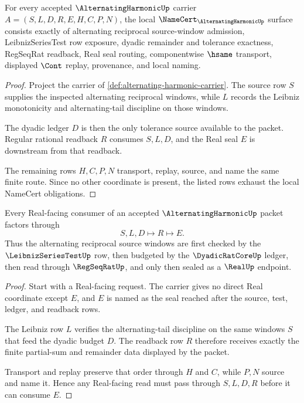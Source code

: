 \begin{theorem}
\label{thm:alternating-harmonic-namecert-obligations}
For every accepted $\AlternatingHarmonicUp$ carrier $A=(S,L,D,R,E,H,C,P,N)$, the local $\NameCert_{\AlternatingHarmonicUp}$ surface consists exactly of alternating reciprocal source-window admission, LeibnizSeriesTest row exposure, dyadic remainder and tolerance exactness, RegSeqRat readback, Real seal routing, componentwise $\hsame$ transport, displayed $\Cont$ replay, provenance, and local naming.
\end{theorem}
\begin{proof}
Project the carrier of \autoref{def:alternating-harmonic-carrier}. The source row $S$ supplies the inspected alternating reciprocal windows, while $L$ records the Leibniz monotonicity and alternating-tail discipline on those windows.

The dyadic ledger $D$ is then the only tolerance source available to the packet. Regular rational readback $R$ consumes $S,L,D$, and the Real seal $E$ is downstream from that readback.

The remaining rows $H,C,P,N$ transport, replay, source, and name the same finite route. Since no other coordinate is present, the listed rows exhaust the local NameCert obligations.
\end{proof}

\begin{theorem}
\label{thm:alternating-harmonic-leibniz-realseal}
Every Real-facing consumer of an accepted $\AlternatingHarmonicUp$ packet factors through
$$
S,L,D \longmapsto R \longmapsto E .
$$
Thus the alternating reciprocal source windows are first checked by the $\LeibnizSeriesTestUp$ row, then budgeted by the $\DyadicRatCoreUp$ ledger, then read through $\RegSeqRatUp$, and only then sealed as a $\RealUp$ endpoint.
\end{theorem}
\begin{proof}
Start with a Real-facing request. The carrier gives no direct Real coordinate except $E$, and $E$ is named as the seal reached after the source, test, ledger, and readback rows.

The Leibniz row $L$ verifies the alternating-tail discipline on the same windows $S$ that feed the dyadic budget $D$. The readback row $R$ therefore receives exactly the finite partial-sum and remainder data displayed by the packet.

Transport and replay preserve that order through $H$ and $C$, while $P,N$ source and name it. Hence any Real-facing read must pass through $S,L,D,R$ before it can consume $E$.
\end{proof}

